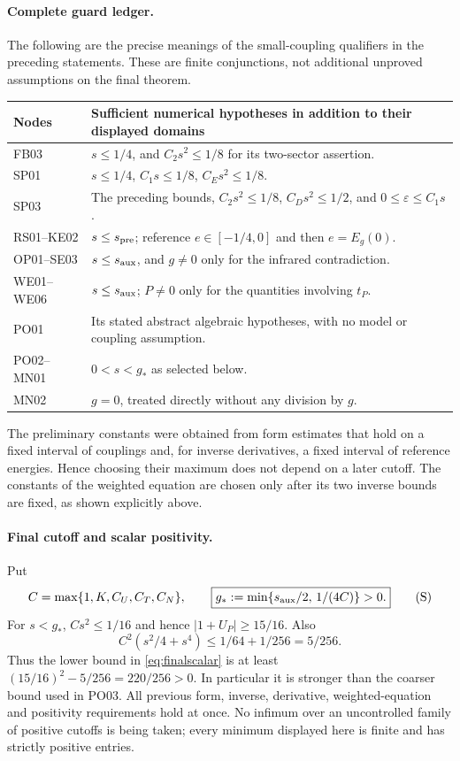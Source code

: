 \documentclass[11pt,a4paper]{article}
\theoremstyle{remark}\newtheorem{remark}[theorem]{Remark}
\begin{document}
\paragraph{Complete guard ledger.}
The following are the precise meanings of the small-coupling qualifiers in the preceding statements. These are finite conjunctions, not additional unproved assumptions on the final theorem.
\begin{center}\small
\begin{tabular}{p{}p{}}
\toprule Nodes & Sufficient numerical hypotheses in addition to their displayed domains\\\midrule
FB03 & $s\leq1/4$, and $C_2s^2\leq1/8$ for its two-sector assertion.\\
SP01 & $s\leq1/4$, $C_1s\leq1/8$, $C_Es^2\leq1/8$.\\
SP03 & The preceding bounds, $C_2s^2\leq1/8$, $C_Ds^2\leq1/2$, and $0\leq\varepsilon\leq C_1s$.\\
RS01--KE02 & $s\leq s_{\rm pre}$; reference $e\in[-1/4,0]$ and then $e=E_g(0)$.\\
OP01--SE03 & $s\leq s_{\rm aux}$, and $g\ne0$ only for the infrared contradiction.\\
WE01--WE06 & $s\leq s_{\rm aux}$; $P\ne0$ only for the quantities involving $t_P$.\\
PO01 & Its stated abstract algebraic hypotheses, with no model or coupling assumption.\\
PO02--MN01 & $0<s<g_*$ as selected below.\\
MN02 & $g=0$, treated directly without any division by $g$.\\
\bottomrule
\end{tabular}\normalsize\end{center}
The preliminary constants were obtained from form estimates that hold on a fixed interval of couplings and, for inverse derivatives, a fixed interval of reference energies. Hence choosing their maximum does not depend on a later cutoff. The constants of the weighted equation are chosen only after its two inverse bounds are fixed, as shown explicitly above.

\paragraph{Final cutoff and scalar positivity.}
Put
\[
 C=\max\{1,K,C_U,C_T,C_N\},\qquad
 \boxed{g_*:=\min\{s_{\rm aux}/2,\,1/(4C)\}>0.}
 \tag{S}\label{eq:gstar}
\]
For $s<g_*$, $Cs^2\leq1/16$ and hence $|1+U_P|\geq15/16$. Also
\[
 C^2(s^2/4+s^4)\leq1/64+1/256=5/256.
\]
Thus the lower bound in \eqref{eq:finalscalar} is at least
$(15/16)^2-5/256=220/256>0$. In particular it is stronger than the coarser bound used in PO03. All previous form, inverse, derivative, weighted-equation and positivity requirements hold at once. No infimum over an uncontrolled family of positive cutoffs is being taken; every minimum displayed here is finite and has strictly positive entries.
\end{document}
